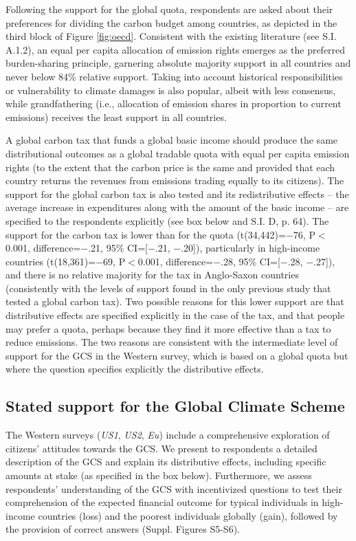 \documentclass[12pt,english]{article}
\begin{document}
Following the support for the global quota, respondents are asked about their preferences for dividing the carbon budget among countries, as depicted in the third block of Figure \ref{fig:oecd}. Consistent with the existing literature (see S.I. A.1.2), %
an equal per capita allocation of emission rights emerges as the preferred burden-sharing principle, garnering absolute majority support in all countries and never below 84\% relative support. Taking into account historical responsibilities or vulnerability to climate damages is also popular, albeit with less consensus, while grandfathering (i.e., allocation of emission shares in proportion to current emissions) receives the least support in all countries.

A global carbon tax that funds a global basic income should produce the same distributional outcomes as a global tradable quota with equal per capita emission rights (to the extent that the carbon price is the same and provided that each country returns the revenues from emissions trading equally to its citizens). %
The support for the global carbon tax is also tested and its redistributive effects --  the average increase in expenditures along with the amount of the basic income -- are specified to the respondents explicitly  (see box below and S.I. D, p. 64). %
The support for the carbon tax is lower than for the quota (t(34,442)=$-$76, P$<$0.001, difference=$-$.21, 95\% CI=[$-$.21, $-$.20]), particularly in high-income countries (t(18,361)=$-$69, P$<$0.001, difference=$-$.28, 95\% CI=[$-$.28, $-$.27]), and there is no relative majority for the tax in Anglo-Saxon countries (consistently with the levels of support found in the only previous study that tested a global carbon tax\cite{carattini_how_2019}). %
Two possible reasons for this lower support are that distributive effects are specified explicitly in the case of the tax, and that people may prefer a quota, perhaps because they find it more effective than a tax to reduce emissions. The two reasons are consistent with the intermediate level of support for the GCS in the Western survey, which is based on a global quota but where the question specifies explicitly the distributive effects. %

\subsection{Stated support for the Global Climate Scheme}\label{subsec:gcs_stated_support}

The Western surveys (\textit{US1}, \textit{US2}, \textit{Eu}) include a comprehensive exploration of citizens' attitudes towards the GCS. We present to respondents a detailed description of the GCS and explain its distributive effects, including specific amounts at stake (as specified in the box below). Furthermore, we assess respondents' understanding of the GCS with incentivized questions to test their comprehension of the expected financial outcome for typical individuals in high-income countries (loss) and the poorest individuals globally (gain), followed by the provision of correct answers (Suppl. Figures S5-S6). %
\end{document}
